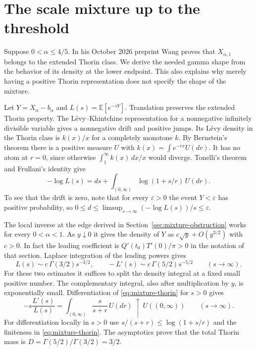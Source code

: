 \documentclass[11pt,a4paper]{article}
\numberwithin{equation}{section}
\begin{document}
\section{The scale mixture up to the threshold}
\label{sec:mixture-positive}

Suppose $0<\alpha\le4/5$. In his October 2026 preprint Wang
\cite[Theorem~1.3 and Theorem~C.4]{MW} proves that
$X_{\alpha,1}$ belongs to the extended Thorin class. We
derive the needed gamma shape from the behavior of its density at the
lower endpoint. This also explains why merely having a positive
Thorin representation does not specify the shape of the mixture.

Let $Y=X_\alpha-b_\alpha$ and $L(s)=\mathbb E[e^{-sY}]$.
Translation preserves the extended Thorin property. The
L\'evy--Khintchine representation for a nonnegative infinitely
divisible variable gives a nonnegative drift and positive jumps.
Its L\'evy density in the Thorin class is $k(x)/x$ for a completely
monotone $k$. By Bernstein's theorem there is a positive measure
$U$ with $k(x)=\int e^{-rx}U(dr)$. It has no atom at $r=0$, since
otherwise $\int_1^\infty k(x)\,dx/x$ would diverge. Tonelli's
theorem and Frullani's identity give
\begin{equation}\label{eq:mixture-thorin}
 -\log L(s)=ds+\int_{(0,\infty)}\log(1+s/r)\,U(dr).
\end{equation}
To see that the drift is zero, note that for every $\varepsilon>0$ the event
$Y<\varepsilon$ has positive probability, so
$0\le d\le\limsup_{s\to\infty}(-\log L(s))/s\le\varepsilon$.

The local inverse at the edge derived in
Section~\ref{sec:mixture-obstruction} works for every $0<\alpha<1$.
As $y\downarrow0$ it gives the density of $Y$ as
$c\sqrt y+O(y^{3/2})$ with $c>0$. In fact the leading coefficient is
$Q'(t_0)T'(0)/\pi>0$ in the notation of that section. Laplace
integration of the leading powers gives
\[
 L(s)\sim c\,\Gamma(3/2)s^{-3/2},
 \qquad -L'(s)\sim c\,\Gamma(5/2)s^{-5/2}
 \qquad(s\to\infty).
\]
For these two estimates it suffices to split the density integral at
a fixed small positive number. The complementary integral, also
after multiplication by $y$, is exponentially small. Differentiation
of \eqref{eq:mixture-thorin} for $s>0$ gives
\[
 -s\frac{L'(s)}{L(s)}
 =\int_{(0,\infty)}\frac{s}{s+r}\,U(dr)
 \ \uparrow\ U((0,\infty))
 \qquad (s\to\infty).
\]
For differentiation locally in $s>0$ use
$s/(s+r)\le\log(1+s/r)$ and the finiteness in
\eqref{eq:mixture-thorin}. The asymptotics prove that the total
Thorin mass is $D=\Gamma(5/2)/\Gamma(3/2)=3/2$.
\end{document}
